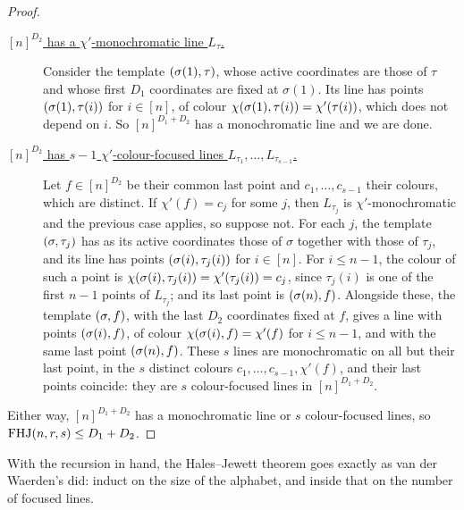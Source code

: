 \begin{proof}
\begin{description}
    \item[\underline{$[n]^{D_2}$ has a $\chi'$-monochromatic line $L_\tau$.}] Consider the template $\left( \sigma(1), \tau \right)$, whose active coordinates are those of $\tau$ and whose first $D_1$ coordinates are fixed at $\sigma(1)$. Its line has points $\left( \sigma(1), \tau(i) \right)$ for $i \in [n]$, of colour $\chi\!\left( \sigma(1), \tau(i) \right) = \chi'\!\left( \tau(i) \right)$, which does not depend on $i$. So $[n]^{D_1 + D_2}$ has a monochromatic line and we are done.
    \item[\underline{$[n]^{D_2}$ has $s - 1$ $\chi'$-colour-focused lines $L_{\tau_1}, \ldots, L_{\tau_{s - 1}}$.}] Let $f \in [n]^{D_2}$ be their common last point and $c_1, \ldots, c_{s - 1}$ their colours, which are distinct. If $\chi'(f) = c_j$ for some $j$, then $L_{\tau_j}$ is $\chi'$-monochromatic and the previous case applies, so suppose not. For each $j$, the template $\left( \sigma, \tau_j \right)$ has as its active coordinates those of $\sigma$ together with those of $\tau_j$, and its line has points $\left( \sigma(i), \tau_j(i) \right)$ for $i \in [n]$. For $i \leq n - 1$, the colour of such a point is $\chi\!\left( \sigma(i), \tau_j(i) \right) = \chi'\!\left( \tau_j(i) \right) = c_j$, since $\tau_j(i)$ is one of the first $n - 1$ points of $L_{\tau_j}$; and its last point is $\left( \sigma(n), f \right)$. Alongside these, the template $\left( \sigma, f \right)$, with the last $D_2$ coordinates fixed at $f$, gives a line with points $\left( \sigma(i), f \right)$, of colour $\chi\!\left( \sigma(i), f \right) = \chi'(f)$ for $i \leq n - 1$, and with the same last point $\left( \sigma(n), f \right)$. These $s$ lines are monochromatic on all but their last point, in the $s$ distinct colours $c_1, \ldots, c_{s - 1}, \chi'(f)$, and their last points coincide: they are $s$ colour-focused lines in $[n]^{D_1 + D_2}$.
\end{description}
Either way, $[n]^{D_1 + D_2}$ has a monochromatic line or $s$ colour-focused lines, so $\operatorname{FHJ}(n, r, s) \leq D_1 + D_2$.
\end{proof}

With the recursion in hand, the Hales--Jewett theorem goes exactly as van der Waerden's did: induct on the size of the alphabet, and inside that on the number of focused lines.

